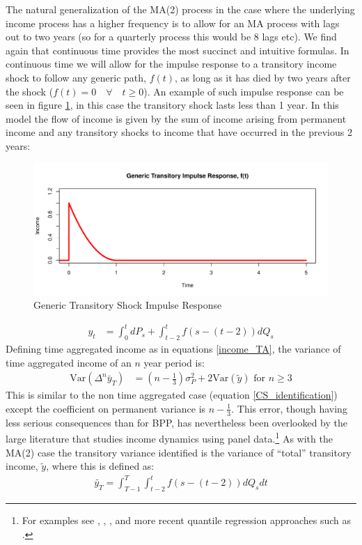 \documentclass[titlepage]{\econtex}\newcommand{\texname}{IncomeUncertainty}
\begin{document}
The natural generalization of the MA(2) process in the case where the underlying income process has a higher frequency is to allow for an MA process with lags out to two years (so for a quarterly process this would be 8 lags etc). We find again that continuous time provides the most succinct and intuitive formulas. In continuous time we will allow for the impulse response to a transitory income shock to follow any generic path, $f(t)$, as long as it has died by two years after the shock ($f(t)=0 \quad \forall \quad t \geq 0$). An example of such impulse response can be seen in figure \ref{fig:GenericTransitory}, in this case the transitory shock lasts less than 1 year. In this model the flow of income is given by the sum of income arising from permanent income and any transitory shocks to income that have occurred in the previous 2 years:
	\begin{figure} 
	\begin{centering}
		\includegraphics[scale=0.7]{Figures/GenericTransitory.png} 
		\caption{Generic Transitory Shock Impulse Response}
		\label{fig:GenericTransitory}
	\end{centering}
\end{figure}
\begin{align*}
y_t &= \int_{0}^{t} dP_s + \int_{t-2}^{t} f(s-(t-2))dQ_s
\end{align*}
Defining time aggregated income as in equations \ref{income_TA}, the variance of time aggregated income of an $n$ year period is:
	\begin{align}
\mathrm{Var}(\Delta^n \bar{y}_T) &= (n-\frac{1}{3})\sigma^2_P +  2 \mathrm{Var}(\tilde{y}) \text{   for }n \geq 3 \label{variance}
\end{align}
This is similar to the non time aggregated case (equation \ref{CS_identification}) except the coefficient on permanent variance is $n-\frac{1}{3}$. This error, though having less serious consequences than for BPP, has nevertheless been overlooked by the large literature that studies income dynamics using panel data.\footnote{For examples see \cite{moffitt_trends_2012}, \cite{meghir_income_2004}, \cite{nielsen_impact_2004}, \cite{heathcote_unequal_2010} and more recent quantile regression approaches such as \cite{arellano_earnings_2017}.} As with the MA(2) case the transitory variance identified is the variance of ``total'' transitory income, $\tilde{y}$, where this is defined as:
\begin{align}
\tilde{y_T} = \int_{T-1}^{T}\int_{t-2}^{t} f(s-(t-2))dQ_s dt \label{tot_income}
\end{align}
\end{document}
